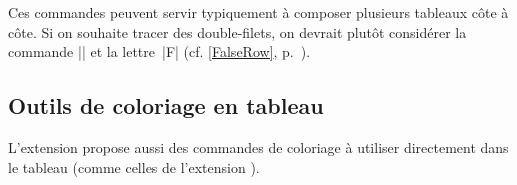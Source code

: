 \documentclass[dvipsnames]{article}
\begin{document}
\medskip
Ces commandes peuvent servir typiquement à composer plusieurs tableaux côte à
côte. Si on souhaite tracer des double-filets, on devrait plutôt considérer la
commande |\FalseRow| et la lettre~|F| (cf. \ref{FalseRow}, p.~\pageref{FalseRow}).




\subsection{Outils de coloriage en tableau}


L'extension  propose aussi des commandes de coloriage à utiliser
directement dans le tableau (comme celles de l'extension ).
\end{document}
